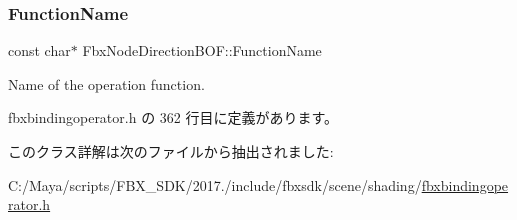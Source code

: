 \subsubsection{\texorpdfstring{Function\+Name}{FunctionName}}
{\footnotesize\ttfamily const char$\ast$ Fbx\+Node\+Direction\+B\+O\+F\+::\+Function\+Name\hspace{0.3cm}{\ttfamily [static]}}



Name of the operation function. 



 fbxbindingoperator.\+h の 362 行目に定義があります。



このクラス詳解は次のファイルから抽出されました\+:\begin{DoxyCompactItemize}
\item 
C\+:/\+Maya/scripts/\+F\+B\+X\+\_\+\+S\+D\+K/2017./include/fbxsdk/scene/shading/\hyperlink{fbxbindingoperator_8h}{fbxbindingoperator.\+h}\end{DoxyCompactItemize}
